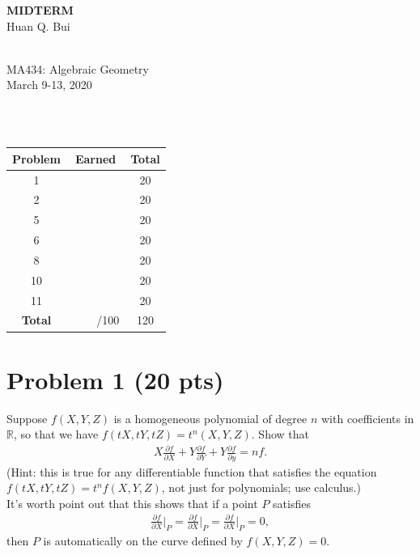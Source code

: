 \documentclass[12pt]{article}
\newcommand{\p}{\partial}
\newcommand{\f}[2]{\frac{#1}{#2}}
\begin{document}
\begin{center}
	\LARGE{\textbf{MIDTERM}}
	\\
	\large{Huan Q. Bui}
	
	\noindent \hrulefill\\
	\small{MA434: Algebraic Geometry}\\
	\small{March 9-13, 2020}\\\vspace{-6pt}
	\hrulefill
\end{center}


$\,$\\
$\,$\\


\begin{center}
\begin{tabular}{|c|c|c|}
	\hline
	Problem & Earned & Total\\
	\hline
	1&&20\\
	\hline
	2&&20\\
	\hline
	5&&20\\
	\hline
	6&&20\\
	\hline
	8&&20\\
	\hline
	10&&20\\
	\hline
	11&&20\\
	\hline
	\textbf{Total}&$\,\quad\quad$/100&120\\
	\hline
\end{tabular}
\end{center}



\newpage




\section*{Problem 1 \small{(20 pts)}}
Suppose $f(X,Y,Z)$ is a homogeneous polynomial of degree $n$ with coefficients in $\mathbb{R}$, so that we have $f(tX,tY,tZ) = t^n(X,Y,Z)$. Show that
\begin{align*}
X\f{\p f}{\p X} + Y\f{\p f}{\p Y} + Y\f{\p f}{\p y}  = nf.
\end{align*}
(Hint: this is true for any differentiable function that satisfies the equation $f(tX,tY,tZ) = t^n f(X,Y,Z)$, not just for polynomials; use calculus.)\\

It's worth point out that this shows that if a point $P$ satisfies 
\begin{align}\label{eq2}
\f{\p f}{\p X}\bigg\vert_P = \f{\p f}{\p X}\bigg\vert_P  = \f{\p f}{\p X}\bigg\vert_P = 0,
\end{align}
then $P$ is automatically on the curve defined by $f(X,Y,Z) = 0$.\\
\end{document}
